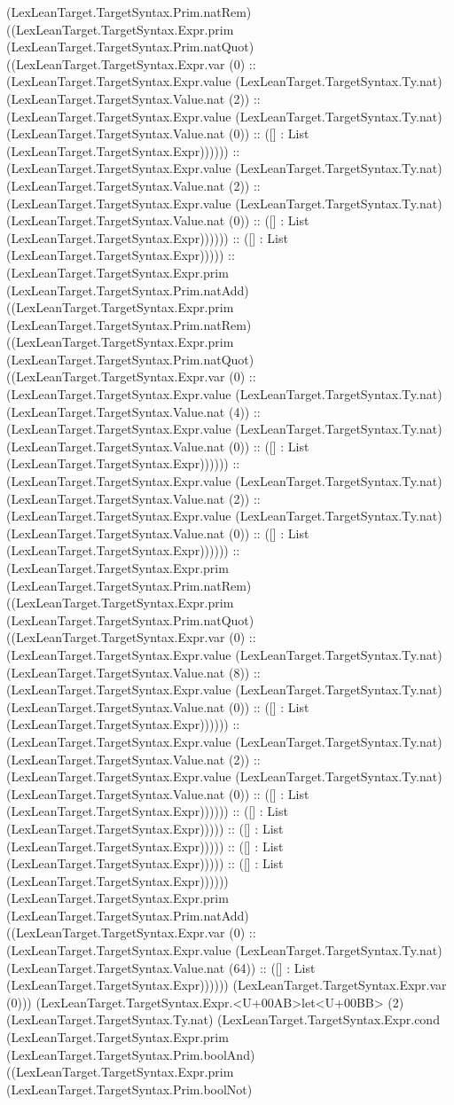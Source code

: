 \documentclass[11pt]{article}
\begin{document}
(LexLeanTarget.TargetSyntax.Prim.natRem) ((LexLeanTarget.TargetSyntax.Expr.prim (LexLeanTarget.TargetSyntax.Prim.natQuot) ((LexLeanTarget.TargetSyntax.Expr.var (0) :: (LexLeanTarget.TargetSyntax.Expr.value (LexLeanTarget.TargetSyntax.Ty.nat) (LexLeanTarget.TargetSyntax.Value.nat (2)) :: (LexLeanTarget.TargetSyntax.Expr.value (LexLeanTarget.TargetSyntax.Ty.nat) (LexLeanTarget.TargetSyntax.Value.nat (0)) :: ([] : List (LexLeanTarget.TargetSyntax.Expr)))))) :: (LexLeanTarget.TargetSyntax.Expr.value (LexLeanTarget.TargetSyntax.Ty.nat) (LexLeanTarget.TargetSyntax.Value.nat (2)) :: (LexLeanTarget.TargetSyntax.Expr.value (LexLeanTarget.TargetSyntax.Ty.nat) (LexLeanTarget.TargetSyntax.Value.nat (0)) :: ([] : List (LexLeanTarget.TargetSyntax.Expr)))))) :: ([] : List (LexLeanTarget.TargetSyntax.Expr))))) :: (LexLeanTarget.TargetSyntax.Expr.prim (LexLeanTarget.TargetSyntax.Prim.natAdd) ((LexLeanTarget.TargetSyntax.Expr.prim (LexLeanTarget.TargetSyntax.Prim.natRem) ((LexLeanTarget.TargetSyntax.Expr.prim (LexLeanTarget.TargetSyntax.Prim.natQuot) ((LexLeanTarget.TargetSyntax.Expr.var (0) :: (LexLeanTarget.TargetSyntax.Expr.value (LexLeanTarget.TargetSyntax.Ty.nat) (LexLeanTarget.TargetSyntax.Value.nat (4)) :: (LexLeanTarget.TargetSyntax.Expr.value (LexLeanTarget.TargetSyntax.Ty.nat) (LexLeanTarget.TargetSyntax.Value.nat (0)) :: ([] : List (LexLeanTarget.TargetSyntax.Expr)))))) :: (LexLeanTarget.TargetSyntax.Expr.value (LexLeanTarget.TargetSyntax.Ty.nat) (LexLeanTarget.TargetSyntax.Value.nat (2)) :: (LexLeanTarget.TargetSyntax.Expr.value (LexLeanTarget.TargetSyntax.Ty.nat) (LexLeanTarget.TargetSyntax.Value.nat (0)) :: ([] : List (LexLeanTarget.TargetSyntax.Expr)))))) :: (LexLeanTarget.TargetSyntax.Expr.prim (LexLeanTarget.TargetSyntax.Prim.natRem) ((LexLeanTarget.TargetSyntax.Expr.prim (LexLeanTarget.TargetSyntax.Prim.natQuot) ((LexLeanTarget.TargetSyntax.Expr.var (0) :: (LexLeanTarget.TargetSyntax.Expr.value (LexLeanTarget.TargetSyntax.Ty.nat) (LexLeanTarget.TargetSyntax.Value.nat (8)) :: (LexLeanTarget.TargetSyntax.Expr.value (LexLeanTarget.TargetSyntax.Ty.nat) (LexLeanTarget.TargetSyntax.Value.nat (0)) :: ([] : List (LexLeanTarget.TargetSyntax.Expr)))))) :: (LexLeanTarget.TargetSyntax.Expr.value (LexLeanTarget.TargetSyntax.Ty.nat) (LexLeanTarget.TargetSyntax.Value.nat (2)) :: (LexLeanTarget.TargetSyntax.Expr.value (LexLeanTarget.TargetSyntax.Ty.nat) (LexLeanTarget.TargetSyntax.Value.nat (0)) :: ([] : List (LexLeanTarget.TargetSyntax.Expr)))))) :: ([] : List (LexLeanTarget.TargetSyntax.Expr))))) :: ([] : List (LexLeanTarget.TargetSyntax.Expr))))) :: ([] : List (LexLeanTarget.TargetSyntax.Expr))))) :: ([] : List (LexLeanTarget.TargetSyntax.Expr)))))) (LexLeanTarget.TargetSyntax.Expr.prim (LexLeanTarget.TargetSyntax.Prim.natAdd) ((LexLeanTarget.TargetSyntax.Expr.var (0) :: (LexLeanTarget.TargetSyntax.Expr.value (LexLeanTarget.TargetSyntax.Ty.nat) (LexLeanTarget.TargetSyntax.Value.nat (64)) :: ([] : List (LexLeanTarget.TargetSyntax.Expr)))))) (LexLeanTarget.TargetSyntax.Expr.var (0))) (LexLeanTarget.TargetSyntax.Expr.<U+00AB>let<U+00BB> (2) (LexLeanTarget.TargetSyntax.Ty.nat) (LexLeanTarget.TargetSyntax.Expr.cond (LexLeanTarget.TargetSyntax.Expr.prim (LexLeanTarget.TargetSyntax.Prim.boolAnd) ((LexLeanTarget.TargetSyntax.Expr.prim (LexLeanTarget.TargetSyntax.Prim.boolNot) 
\end{document}
